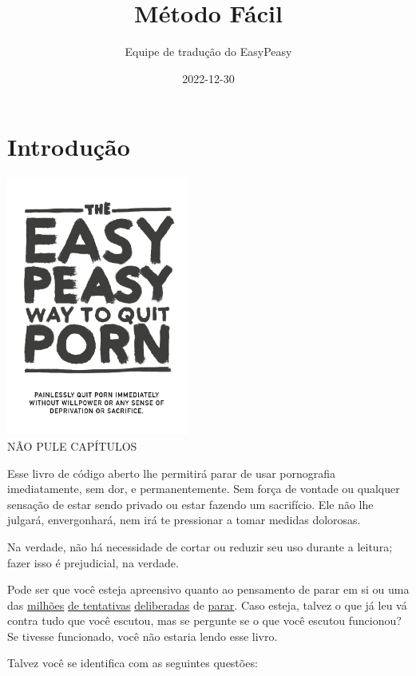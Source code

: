 \documentclass[
  spanish,
  openany]{book}
\title{Método Fácil}
\author{Equipe de tradução do EasyPeasy}
\date{2022-12-30}
\let\oldhref\href
\renewcommand{\href}[2]{\textcolor{linkcolor}{\oldhref{#1}{#2}}}
\begin{document}
\maketitle

{
\setcounter{tocdepth}{1}
\tableofcontents
}
\hypertarget{introducao}{%
\chapter{Introdução}\label{introducao}}

\includegraphics[width=0.45\textwidth,height=0.45\textheight]{img-cover.jpg}\\

{NÃO PULE CAPÍTULOS}

Esse livro de código aberto lhe permitirá parar de usar pornografia imediatamente, sem dor, e permanentemente. Sem força de vontade ou qualquer sensação de estar sendo privado ou estar fazendo um sacrifício. Ele não lhe julgará, envergonhará, nem irá te pressionar a tomar medidas dolorosas.

Na verdade, não há necessidade de cortar ou reduzir seu uso durante a leitura; fazer isso é prejudicial, na verdade.

Pode ser que você esteja apreensivo quanto ao pensamento de parar em si ou uma das \href{https://old.reddit.com/r/nofap}{milhões} \href{https://rebootnation.org/}{de tentativas} \href{https://old.reddit.com/r/pornfree}{deliberadas} de \href{https://yourbrainrebalanced.com/}{parar}. Caso esteja, talvez o que já leu vá contra tudo que você escutou, mas se pergunte se o que você escutou funcionou? Se tivesse funcionado, você não estaria lendo esse livro.

Talvez você se identifica com as seguintes questões:
\end{document}
